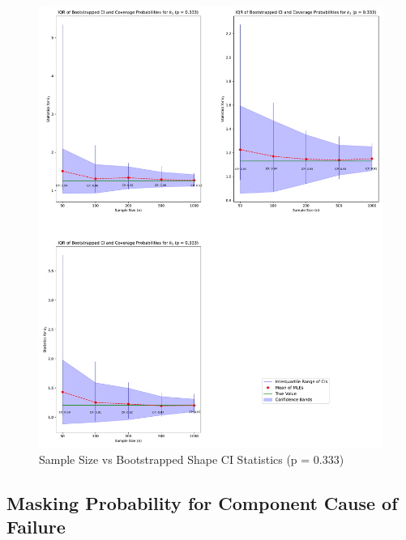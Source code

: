 \documentclass[
]{article}
\begin{document}
\begin{figure}

{\centering \includegraphics{image/plot-n-vs-stats-p333-shape} 

}

\caption{Sample Size vs Bootstrapped Shape CI Statistics (p = 0.333)}\label{fig:samp-size-n-vs-stats-p333-shape}
\end{figure}

\hypertarget{sec:p-vs-mttf}{%
\subsection{Masking Probability for Component Cause of
Failure}\label{sec:p-vs-mttf}}
\end{document}

